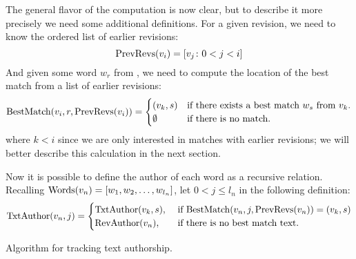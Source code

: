 The general flavor of the computation is now clear, but to describe it
more precisely we need some additional definitions.
For a given revision, we need to know the ordered list of earlier
revisions:
\begin{equation*}
    \mathrm{PrevRevs}(v_{i}) = \left[ v_{j} \colon  0 < j < i \right]
\end{equation*}
And given some word $w_r$ from , we need to compute the
location of the best match from a list of earlier revisions:
\begin{equation*}
    \mathrm{BestMatch}(v_{i}, r, \mathrm{PrevRevs}(v_{i})) =
    \begin{cases}
	(v_{k}, s) & \text{if there exists a best match $w_s$ from \ensuremath{v_{k}}.} \\
	\emptyset & \text{if there is no match.} \\
    \end{cases}
\end{equation*}
where $k < i$ since we are only interested in matches with earlier revisions;
we will better describe this calculation in the next section.

Now it is possible to define the author of each word as a recursive relation.
Recalling $\mathrm{Words}(v_{n}) = \left[ w_1, w_2, \ldots, w_{l_n} \right]$, let $0 < j \le l_n$ in the following definition:
\begin{equation*}
\mathrm{TxtAuthor}(v_{n}, j) =
    \begin{cases}
	\mathrm{TxtAuthor}(v_{k}, s), & \text{ if }
	\mathrm{BestMatch}(v_{n}, j, \mathrm{PrevRevs}(v_{n})) = (v_{k}, s) \\
	\mathrm{RevAuthor}(v_{n}), & \text{ if there is no best match text. } \\
    \end{cases}
\end{equation*}


\begin{algorithm}
{}
\caption{Algorithm for tracking text authorship.}
\end{algorithm}


